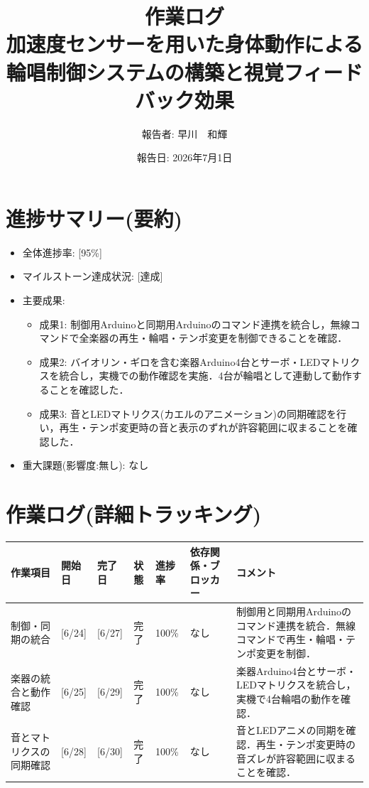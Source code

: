 \documentclass[uplatex,dvipdfmx]{jlreq}
\title{作業ログ\\ \large 加速度センサーを用いた身体動作による輪唱制御システムの構築と視覚フィードバック効果}
\author{報告者: 早川　和輝}
\date{報告日: 2026年7月1日}
\begin{document}
\maketitle

\section{進捗サマリー(要約)}
\begin{itemize}
    \item 全体進捗率: [95\%]
    \item マイルストーン達成状況: [達成]
    \item 主要成果:
    \begin{itemize}
        \item 成果1: 制御用Arduinoと同期用Arduinoのコマンド連携を統合し，無線コマンドで全楽器の再生・輪唱・テンポ変更を制御できることを確認．
        \item 成果2: バイオリン・ギロを含む楽器Arduino4台とサーボ・LEDマトリクスを統合し，実機での動作確認を実施．4台が輪唱として連動して動作することを確認した．
        \item 成果3: 音とLEDマトリクス(カエルのアニメーション)の同期確認を行い，再生・テンポ変更時の音と表示のずれが許容範囲に収まることを確認した．
    \end{itemize}
    \item 重大課題(影響度:無し): なし
\end{itemize}

\section{作業ログ(詳細トラッキング)}
\begin{table}[H]
    \centering
    \small
    \begin{tabular}{lp{1.5cm}p{1.5cm}llp{2.5cm}p{3cm}}
        \toprule
        作業項目 & 開始日 & 完了日 & 状態 & 進捗率 & 依存関係・ブロッカー & コメント \\
        \midrule
        制御・同期の統合 & [6/24] & [6/27] & 完了 & 100\% & なし & 制御用と同期用Arduinoのコマンド連携を統合．無線コマンドで再生・輪唱・テンポ変更を制御． \\
        楽器の統合と動作確認 & [6/25] & [6/29] & 完了 & 100\% & なし & 楽器Arduino4台とサーボ・LEDマトリクスを統合し，実機で4台輪唱の動作を確認． \\
        音とマトリクスの同期確認 & [6/28] & [6/30] & 完了 & 100\% & なし & 音とLEDアニメの同期を確認．再生・テンポ変更時の音ズレが許容範囲に収まることを確認． \\
        \bottomrule
    \end{tabular}
\end{table}
\end{document}
